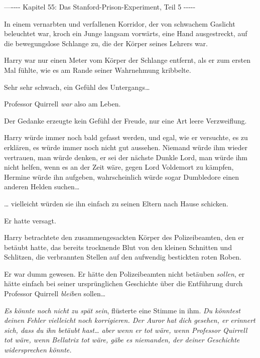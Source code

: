 

\hypertarget{das-stanford-prison-experiment-teil-5}{%

—\/-\/-\/-\/- Kapitel 55: Das Stanford-Prison-Experiment, Teil 5 -\/-\/-\/-\/-

In einem vernarbten und verfallenen Korridor, der von schwachem Gaslicht beleuchtet war, kroch ein Junge langsam vorwärts, eine Hand ausgestreckt, auf die bewegungslose Schlange zu, die der Körper seines Lehrers war.

Harry war nur einen Meter vom Körper der Schlange entfernt, als er zum ersten Mal fühlte, wie es am Rande seiner Wahrnehmung kribbelte.

Sehr sehr schwach, ein Gefühl des Untergangs…

Professor Quirrell \emph{war} also am Leben.

Der Gedanke erzeugte kein Gefühl der Freude, nur eine Art leere Verzweiflung.

Harry würde immer noch bald gefasst werden, und egal, wie er versuchte, es zu erklären, es würde immer noch nicht gut aussehen. Niemand würde ihm wieder vertrauen, man würde denken, er sei der nächste Dunkle Lord, man würde ihm nicht helfen, wenn es an der Zeit wäre, gegen Lord Voldemort zu kämpfen, Hermine würde ihn aufgeben, wahrscheinlich würde sogar Dumbledore einen anderen Helden suchen…

… vielleicht würden sie ihn einfach zu seinen Eltern nach Hause schicken.

Er hatte versagt.

Harry betrachtete den zusammengesackten Körper des Polizeibeamten, den er betäubt hatte, das bereits trocknende Blut von den kleinen Schnitten und Schlitzen, die verbrannten Stellen auf den aufwendig bestickten roten Roben.

Er war dumm gewesen. Er hätte den Polizeibeamten nicht betäuben \emph{sollen}, er hätte einfach bei seiner ursprünglichen Geschichte über die Entführung durch Professor Quirrell \emph{bleiben} sollen…

\emph{Es könnte noch nicht zu spät sein}, flüsterte eine Stimme in ihm. \emph{Du könntest deinen Fehler vielleicht noch korrigieren. Der Auror hat dich gesehen, er erinnert sich, dass du ihn betäubt hast… aber wenn er tot wäre, wenn Professor Quirrell tot wäre, wenn Bellatrix tot wäre, gäbe es niemanden, der deiner Geschichte widersprechen könnte.}

}
